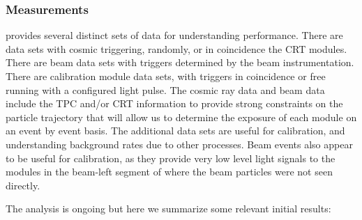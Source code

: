 
\subsubsection{  Measurements}
\label{sec:protodune-results}


 provides several distinct sets of data for understanding  performance.  
There are data sets with cosmic triggering, randomly, or in coincidence the CRT modules.
There are beam data sets with triggers determined by the beam instrumentation.
There are calibration module data sets, with triggers in coincidence or free running with a configured light pulse. The cosmic ray data and beam data include the TPC and/or CRT information to provide strong constraints on the particle trajectory that will allow us to determine the exposure of each module on an event by event basis.  The additional data sets are useful for calibration, and understanding background rates due to other processes.  Beam events also appear to be useful for calibration, as they provide very low level light signals to the modules in the beam-left segment of  where the beam particles were not seen directly.

The analysis is ongoing but here we summarize some relevant initial results:


